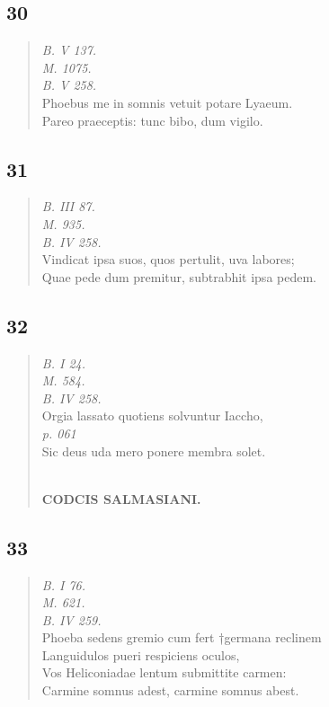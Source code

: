 \documentclass[11pt, a4paper]{report}
\begin{document}
            \subsection*{30}
      \begin{verse}
      \textit{B. V 137.} \\ \textit{M. 1075.} \\ \textit{B. V 258.} \\ Phoebus me in somnis vetuit potare Lyaeum. \\ Pareo praeceptis: tunc bibo, dum vigilo. \\ 
      \end{verse}
  
            \subsection*{31}
      \begin{verse}
      \textit{B. III 87.} \\ \textit{M. 935.} \\ \textit{B. IV 258.} \\ Vindicat ipsa suos, quos pertulit, uva labores; \\ Quae pede dum premitur, subtrabhit ipsa pedem. \\ 
      \end{verse}
  
            \subsection*{32}
      \begin{verse}
      \textit{B. I 24.} \\ \textit{M. 584.} \\ \textit{B. IV 258.} \\ Orgia lassato quotiens solvuntur Iaccho, \\ \textit{p. 061} \\ Sic deus uda mero ponere membra solet. \\ 
        ﻿\pagebreak 
    \begin{center} \textbf{CODCIS SALMASIANI.} \end{center} \marginpar{[101]} 
      \end{verse}
  
            \subsection*{33}
      \begin{verse}
      \textit{B. I 76.} \\ \textit{M. 621.} \\ \textit{B. IV 259.} \\ Phoeba sedens gremio cum fert †germana reclinem \\ Languidulos pueri respiciens oculos, \\ Vos Heliconiadae lentum submittite carmen: \\ Carmine somnus adest, carmine somnus abest. \\ 
      \end{verse}
  
\end{document}
